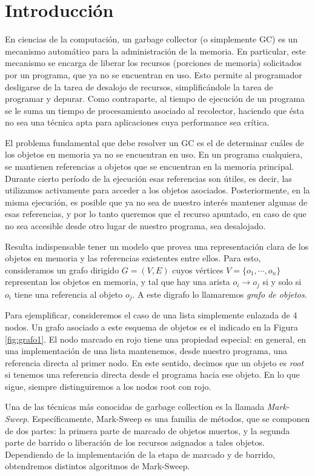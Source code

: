 \section{Introducción}
En ciencias de la computación, un garbage collector (o simplemente GC) es un mecanismo automático para la administración de la memoria. En particular, este mecanismo se encarga de liberar los recursos (porciones de memoria) solicitados por un programa, que ya no se encuentran en uso. Esto permite al programador desligarse de la tarea de desalojo de recursos, simplificándole la tarea de programar y depurar. Como contraparte, al tiempo de ejecución de un programa se le suma un tiempo de procesamiento asociado al recolector, haciendo que ésta no sea una técnica apta para aplicaciones cuya performance sea crítica.

El problema fundamental que debe resolver un GC es el de determinar cuáles de los objetos en memoria ya no se encuentran en uso. En un programa cualquiera, se mantienen referencias a objetos que se encuentran en la memoria principal. Durante cierto período de la ejecución esas referencias son útiles, es decir, las utilizamos activamente para acceder a los objetos asociados. Posteriormente, en la misma ejecución, es posible que ya no sea de nuestro interés mantener algunas de esas referencias, y por lo tanto queremos que el recurso apuntado, en caso de que no sea accesible desde otro lugar de nuestro programa, sea desalojado.

Resulta indispensable tener un modelo que provea una representación clara de los objetos en memoria y las referencias existentes entre ellos. Para esto, consideramos un grafo dirigido $G = (V, E)$ cuyos vértices $V = \{o_1, \cdots, o_n\}$ representan los objetos en memoria, y tal que hay una arista $o_i \to o_j$ si y solo si $o_i$ tiene una referencia al objeto $o_j$. A este digrafo lo llamaremos \textit{grafo de objetos}. 

Para ejemplificar, consideremos el caso de una lista simplemente enlazada de 4 nodos. Un grafo asociado a este esquema de objetos es el indicado en la Figura \ref{fig:grafo1}. El nodo marcado en rojo tiene una propiedad especial: en general, en una implementación de una lista mantenemos, desde nuestro programa, una referencia directa al primer nodo. En este sentido, decimos que un objeto es \textit{root} si tenemos una referencia directa desde el programa hacia ese objeto. En lo que sigue, siempre distinguiremos a los nodos root con rojo.
 
Una de las técnicas más conocidas de garbage collection es la llamada \textit{Mark-Sweep}. Específicamente, Mark-Sweep es una familia de métodos, que se componen de dos partes: la primera parte de marcado de objetos muertos, y la segunda parte de barrido o liberación de los recursos asignados a tales objetos. Dependiendo de la implementación de la etapa de marcado y de barrido, obtendremos distintos algoritmos de Mark-Sweep.
 
